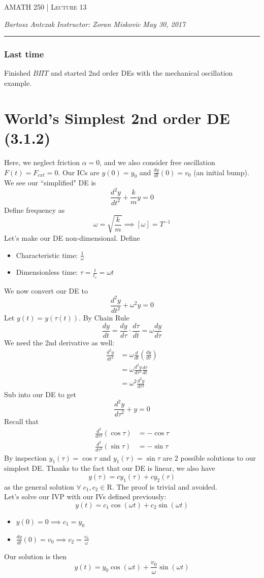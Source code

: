 \documentclass{report}
\newcommand{\lectureNum}{13}
\newcommand{\curDate}{May 30, 2017}
\newcommand{\course}{AMATH 250}
\newcommand{\instructor}{Zoran Miskovic}
\begin{document}
\begin{center}
\begin{Large}
\textsc{\course{} | Lecture \lectureNum{}}
\end{Large}
\end{center} 
\noindent \textit{Bartosz Antczak} \hfill
\textit{Instructor: \instructor{}} \hfill
\textit{\curDate{}}
\rule{\textwidth}{0.4pt}
\subsubsection{Last time}
Finished $B\Pi T$ and started 2nd order DEs with the mechanical oscillation example.
\section{World's Simplest 2nd order DE (3.1.2)}
Here, we neglect friction $\alpha = 0$, and we also consider free oscillation $F(t) = F_{ext} = 0.$ Our ICs are $y(0) = y_0$ and $\frac{dy}{dt}(0) = v_0$ (an initial bump). We see our ``simplified" DE is
\begin{equation}
\frac{d^2y}{dt^2} + \frac{k}{m}y = 0
\end{equation}
Define frequency as
$$\omega = \sqrt{\frac{k}{m}} \implies [\omega] = T^{-1}$$
Let's make our DE non-dimensional. Define
\begin{itemize}
\item Characteristic time: $\frac{1}{\omega}$
\item Dimensionless time: $\tau = \frac{t}{t_c} = \omega t$
\end{itemize}
We now convert our DE to
$$\frac{d^2y}{dt^2} + \omega^2y = 0$$
Let $y(t) = y(\tau(t))$. By Chain Rule
$$\frac{dy}{dt} = \frac{dy}{d\tau}\cdot \frac{d\tau}{dt} = \omega \frac{dy}{d\tau}$$
We need the 2nd derivative as well:
\begin{align}
\frac{d^2y}{dt^2} &= \omega \frac{d}{dt}\left(\frac{dy}{d\tau}\right) \\
&= \omega \frac{d^2y}{d\tau^2}\frac{d\tau}{dt} \\
&= \omega^2 \frac{d^2y}{d\tau^2}
\end{align}
Sub into our DE to get
$$\frac{d^2y}{d\tau^2} + y = 0$$
Recall that 
\begin{align*}
\frac{d^2}{d\tau^2}(\cos \tau) &= -\cos \tau \\
\frac{d^2}{d\tau^2}(\sin \tau) &= -\sin \tau 
\end{align*}
By inspection $y_1(\tau) = \cos \tau$ and $y_1(\tau) = \sin \tau$ are 2 possible solutions to our simplest DE. Thanks to the fact that our DE is linear, we also have
$$y(\tau) = cy_1(\tau) + cy_2(\tau)$$
as the general solution $\forall \; c_1, c_2 \in \mathrm{R}$. The proof is trivial and avoided. \\
Let's solve our IVP with our IVs defined previously:
$$y(t) = c_1 \cos (\omega t) + c_2 \sin (\omega t)$$
\begin{itemize}
\item $y(0) = 0 \implies  c_1 = y_0$
\item $\frac{dy}{dt}(0) = v_0 \implies c_2 = \frac{v_0}{\omega}$
\end{itemize}
Our solution is then
$$y(t) = y_0 \cos (\omega t) + \frac{v_0}{\omega} \sin (\omega t)$$
\end{document}
